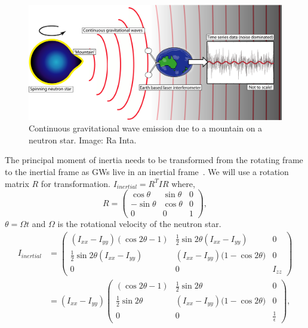 \documentclass{ttuthes2007}
\begin{document}
\begin{figure}[h!]                                                            
        \includegraphics[width=\textwidth]{figure/CW.png}                 
        \caption{Continuous gravitational wave emission due to a mountain on a
neutron star. Image: Ra Inta.}
        \label{fig:CW}                                                 
\end{figure}     
The principal moment of inertia needs to be transformed from the rotating frame to 
the inertial frame as \acp{GW} live in an inertial frame~\cite{PhysRevD.20.351}. 
We will use a rotation matrix $R$ for transformation.
$I_{inertial}= R^T I R$
where, 
\begin{equation}
R=
\begin{pmatrix}
\cos\theta & \sin\theta & 0 \\
-\sin\theta & \cos\theta & 0 \\
0 & 0 & 1
\end{pmatrix},
\end{equation}
$\theta=\Omega t$ and $\Omega$ is the rotational velocity of the neutron star.
\begin{equation}
\begin{split}
I_{inertial}&=
\begin{pmatrix}
(I_{xx}-I_{yy})(\cos{2\theta} -1) & \frac{1}{2}\sin{2\theta}(I_{xx}-I_{yy}) & 0 \\
\frac{1}{2}\sin{2\theta}(I_{xx}-I_{yy}) & (I_{xx}-I_{yy})(1-\cos{2\theta)} & 0  \\
0 & 0 & I_{zz}
\end{pmatrix}\\
&=(I_{xx}-I_{yy})
\begin{pmatrix}
(\cos2\theta -1) & \frac{1}{2}\sin{2\theta} & 0 \\
\frac{1}{2}\sin{2\theta} & (I_{xx}-I_{yy})(1-\cos{2\theta)} & 0  \\
0 & 0 & \frac{1}{\epsilon}
\end{pmatrix},
\end{split}
\end{equation}
\end{document}
